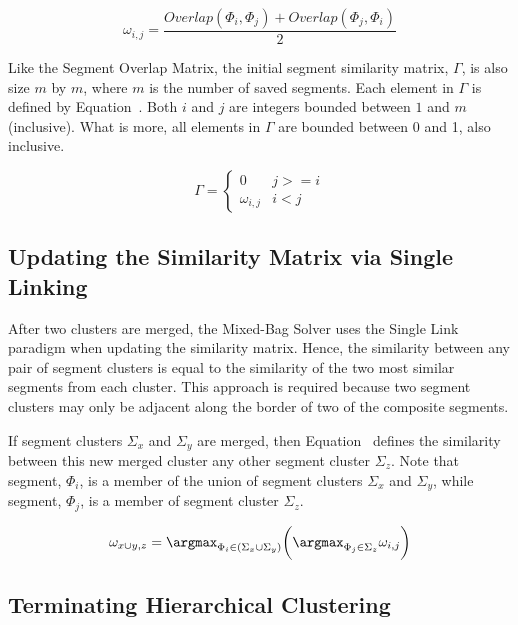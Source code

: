 \begin{equation} \label{eq:segmentSimilarity}
\omega_{i,j} = \frac{Overlap(\Phi_i, \Phi_j) + Overlap(\Phi_j, \Phi_i)}{2} 
\end{equation}

Like the Segment Overlap Matrix, the initial segment similarity matrix, $\Gamma$, is also size $m$ by $m$, where $m$ is the number of saved segments.  Each element in $\Gamma$ is defined by Equation~.  Both $i$ and $j$ are integers bounded between $1$ and $m$ (inclusive).  What is more, all elements in $\Gamma$ are bounded between 0 and 1, also inclusive.

\begin{equation} \label{eq:similarityMatrix}
\Gamma = \begin{cases} 
	0 & j >= i
\\
	\omega_{i,j} & i < j
\end{cases} 
\end{equation}

\subsection{Updating the Similarity Matrix via Single Linking}

After two clusters are merged, the Mixed-Bag Solver uses the Single Link paradigm when updating the similarity matrix.  Hence, the similarity between any pair of segment clusters is equal to the similarity of the two most similar segments from each cluster.  This approach is required because two segment clusters may only be adjacent along the border of two of the composite segments.  

If segment clusters $\Sigma_x$ and $\Sigma_y$ are merged, then Equation~ defines the similarity between this new merged cluster any other segment cluster $\Sigma_z$.  Note that segment, $\Phi_i$, is a member of the union of segment clusters $\Sigma_x$ and $\Sigma_y$, while segment, $\Phi_j$, is a member of segment cluster $\Sigma_z$.

\begin{equation} \label{eq:segmentClusterMerge}
	\omega_{x \cup y,z} = \argmax_{\Phi_i \in (\Sigma_x \cup \Sigma_y)} \bigg( \argmax_{\Phi_j \in \Sigma_z} \omega_{i,j} \bigg) 
\end{equation}

\subsection{Terminating Hierarchical Clustering}

